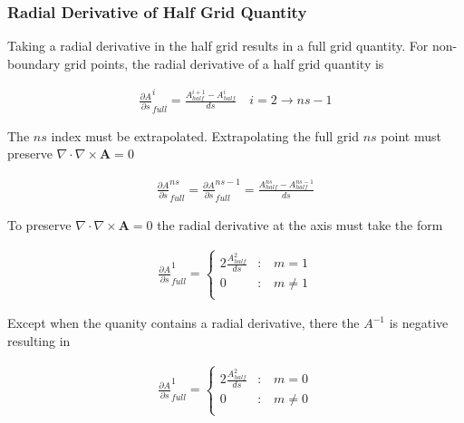 \documentclass[11pt]{article}
\renewcommand{\vec}[1]{\boldsymbol#1}
\newcommand{\equ}[2]{
	\begin{equation}
    \begin{split}
	#1
	\label{#2}
	\end{split}
	\end{equation}
}
\begin{document}
\subsubsection{Radial Derivative of Half Grid Quantity}
Taking a radial derivative in the half grid results in a full grid quantity.
For non-boundary grid points, the radial derivative of a half grid quantity is
\equ{
\frac{\partial A}{\partial s}^{i}_{full}=\frac{A^{i+1}_{half}-A^{i}_{half}}{ds}\quad i=2\rightarrow ns-1
}{equ:half_ds}
The $ns$ index must be extrapolated.
Extrapolating the full grid $ns$ point must preserve $\nabla\cdot\nabla\times\vec{A}=0$
\equ{
\frac{\partial A}{\partial s}^{ns}_{full}=\frac{\partial A}{\partial s}^{ns-1}_{full}=\frac{A^{ns}_{half}-A^{ns-1}_{half}}{ds}
}{equ:half_ds_ns}
To preserve $\nabla\cdot\nabla\times\vec{A}=0$ the radial derivative at the axis must take the form
\equ{
\frac{\partial A}{\partial s}^{1}_{full}=\left\{
\begin{array}{ll}
2\frac{A^{2}_{half}}{ds} & \textrm{:}\quad m=1 \\
0                        & \textrm{:}\quad m\ne1\\
\end{array}
\right.
}{equ:half_ds_ghost}
Except when the quanity contains a radial derivative, there the $A^{-1}$ is negative resulting in
\equ{
\frac{\partial A}{\partial s}^{1}_{full}=\left\{
\begin{array}{ll}
2\frac{A^{2}_{half}}{ds} & \textrm{:}\quad m=0 \\
0                        & \textrm{:}\quad m\ne0\\
\end{array}
\right.
}{equ:half_ds_ghost}
\end{document}
